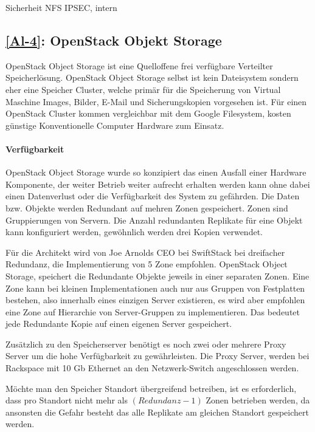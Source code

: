 Sicherheit NFS IPSEC, intern



\subsection{\ref{Al-4}: OpenStack Objekt Storage}
OpenStack Object Storage ist eine Quelloffene frei verfügbare Verteilter Speicherlösung. OpenStack Object Storage selbst ist kein Dateisystem sondern eher eine Speicher Cluster, welche primär für die Speicherung von Virtual Maschine Images, Bilder, E-Mail und Sicherungskopien vorgesehen ist. Für einen OpenStack Cluster kommen vergleichbar mit dem Google Filesystem, kosten günstige Konventionelle Computer Hardware zum Einsatz. 


\paragraph{Verfügbarkeit}
OpenStack Object Storage wurde so konzipiert das einen Ausfall einer Hardware Komponente, der weiter Betrieb weiter aufrecht erhalten werden kann ohne dabei einen Datenverlust oder die Verfügbarkeit des System zu gefährden. Die Daten bzw. Objekte werden Redundant auf mehren Zonen gespeichert. Zonen sind Gruppierungen von Servern. Die Anzahl redundanten Replikate für eine Objekt kann konfiguriert werden, gewöhnlich werden drei Kopien verwendet.

Für die Architekt wird von Joe Arnolds CEO bei SwiftStack bei dreifacher Redundanz, die Implementierung von 5 Zone empfohlen. OpenStack Object Storage, speichert die Redundante Objekte jeweils in einer separaten Zonen. Eine Zone kann bei kleinen Implementationen auch nur aus Gruppen von Festplatten bestehen, also innerhalb eines einzigen Server existieren, es wird aber empfohlen eine Zone auf Hierarchie von Server-Gruppen zu implementieren. Das bedeutet jede Redundante Kopie auf einen eigenen Server gespeichert. \cite{Arnold} 

Zusätzlich zu den Speicherserver benötigt es noch zwei oder mehrere Proxy Server um die hohe Verfügbarkeit zu gewährleisten. Die Proxy Server, werden bei Rackspace mit  10 Gb Ethernet an den Netzwerk-Switch angeschlossen werden. \cite{OpenStack2011}

Möchte man den Speicher Standort übergreifend betreiben, ist es erforderlich, dass pro Standort nicht mehr als $(Redundanz -1)$ Zonen betrieben werden, da ansonsten die Gefahr besteht das alle Replikate am gleichen Standort gespeichert werden.

